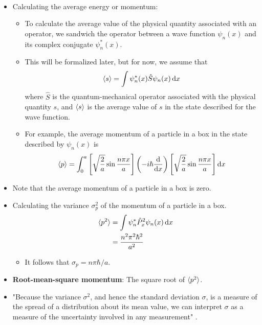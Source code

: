 \documentclass[../notes.tex]{subfiles}
\begin{document}
\begin{itemize}
\begin{align*}
    \end{align*}
    \item Calculating the average energy or momentum:
    \begin{itemize}
        \item To calculate the average value of the physical quantity associated with an operator, we sandwich the operator between a wave function $\psi_n(x)$ and its complex conjugate $\psi_n^*(x)$.
        \item This will be formalized later, but for now, we assume that
        \begin{equation*}
            \langle{s}\rangle = \int\psi_n^*(x)\hat{S}\psi_n(x)\dd{x}
        \end{equation*}
        where $\hat{S}$ is the quantum-mechanical operator associated with the physical quantity $s$, and $\langle{s}\rangle$ is the average value of $s$ in the state described for the wave function.
        \item For example, the average momentum of a particle in a box in the state described by $\psi_n(x)$ is
        \begin{equation*}
            \langle{p}\rangle = \int_0^a\left[ \sqrt{\frac{2}{a}}\sin\frac{n\pi x}{a} \right]\left( -i\hbar\dv{x} \right)\left[ \sqrt{\frac{2}{a}}\sin\frac{n\pi x}{a} \right]\dd{x}
        \end{equation*}
    \end{itemize}
    \item Note that the average momentum of a particle in a box is zero.
    \item {}Calculating the variance $\sigma_p^2$ of the momentum of a particle in a box.
    \begin{align*}
        \langle{p^2}\rangle &= \int\psi_n^*\hat{P}_x^2\psi_n(x)\dd{x}\\
        &= \frac{n^2\pi^2\hbar^2}{a^2}
    \end{align*}
    \begin{itemize}
        \item It follows that $\sigma_p=n\pi\hbar/a$.
    \end{itemize}
    \item \textbf{Root-mean-square momentum}: The square root of $\langle{p^2}\rangle$.
    \item "Because the variance $\sigma^2$, and hence the standard deviation $\sigma$, is a measure of the spread of a distribution about its mean value, we can interpret $\sigma$ as a measure of the uncertainty involved in any measurement" \parencite[89]{bib:McQuarrieSimon}.

\end{itemize}
\end{document}
